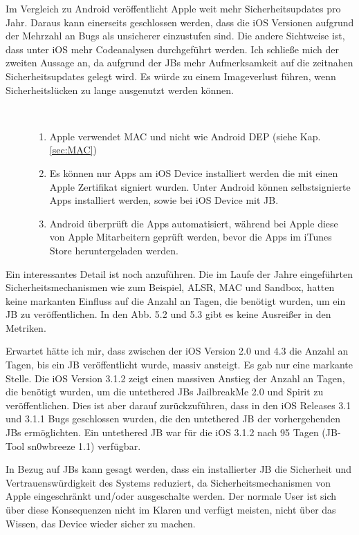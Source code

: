 Im Vergleich zu Android veröffentlicht Apple weit mehr Sicherheitsupdates pro Jahr. Daraus kann einerseits geschlossen werden, dass die iOS Versionen aufgrund der Mehrzahl an Bugs als unsicherer einzustufen sind. Die andere Sichtweise ist, dass unter iOS mehr Codeanalysen durchgeführt werden. Ich schließe mich der zweiten Aussage an, da aufgrund der JBs mehr Aufmerksamkeit auf die zeitnahen Sicherheitsupdates gelegt wird. Es würde zu einem Imageverlust führen, wenn Sicherheitslücken zu lange ausgenutzt werden können. \par
\begin{description}
    \item[\parbox{\textwidth} {Auch in Bezug auf die Sicherheitsmechanismen hat Apple weitere Vorteile gegenüber Android}]~\par
    \begin{enumerate}
        \item Apple verwendet MAC und nicht wie Android DEP (siehe Kap. \ref{sec:MAC})
        \item Es können nur Apps am iOS Device installiert werden die mit einen Apple Zertifikat signiert wurden. Unter Android können selbstsignierte Apps installiert werden, sowie bei iOS Device mit JB.
        \item Android überprüft die Apps automatisiert, während bei Apple diese von Apple Mitarbeitern geprüft werden, bevor die Apps im iTunes Store heruntergeladen werden.  
    \end{enumerate}
\end{description} 

Ein interessantes Detail ist noch anzuführen. Die im Laufe der Jahre eingeführten Sicherheitsmechanismen wie zum Beispiel, ALSR, MAC und Sandbox, hatten keine markanten Einfluss auf die Anzahl an Tagen, die benötigt wurden, um ein JB zu veröffentlichen. In den Abb. 5.2 und 5.3 gibt es keine Ausreißer in den Metriken.\par  
Erwartet hätte ich mir, dass zwischen der iOS Version 2.0 und 4.3 die Anzahl an Tagen, bis ein JB veröffentlicht wurde, massiv ansteigt.  Es gab nur eine markante Stelle. Die iOS Version 3.1.2 zeigt einen massiven Anstieg der Anzahl an Tagen, die benötigt wurden, um die untethered JBs JailbreakMe 2.0 und Spirit zu veröffentlichen. Dies ist aber darauf zurückzuführen, dass in den iOS Releases 3.1 und 3.1.1 Bugs geschlossen wurden,  die den untethered JB der vorhergehenden JBs ermöglichten. Ein untethered JB war für die iOS 3.1.2 nach 95 Tagen (JB-Tool sn0wbreeze 1.1) verfügbar.\par
 
In Bezug auf JBs kann gesagt werden, dass ein installierter JB die Sicherheit und Vertrauenswürdigkeit des Systems reduziert, da Sicherheitsmechanismen von Apple eingeschränkt und/oder ausgeschalte werden. Der normale User ist sich über diese Konsequenzen nicht im Klaren und verfügt meisten, nicht über das Wissen, das Device wieder sicher zu machen.
